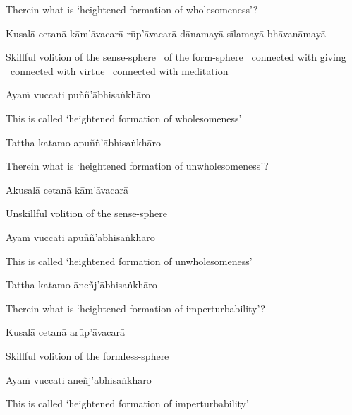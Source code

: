 \begin{english}
  Therein what is `heightened formation of wholesomeness'?
\end{english}

\begin{pali-hang}
  Kusalā cetanā kām'āvacarā rūp'āvacarā dānamayā sīlamayā bhāvanāmayā
\end{pali-hang}

\begin{english-hang}
  Skillful volition of the sense-sphere \breathmark\ of the form-sphere \breathmark\ connected with giving \breathmark\ connected with virtue \breathmark\ connected with meditation
\end{english-hang}

Ayaṁ vuccati puññ'ābhisaṅkhāro

\begin{english}
  This is called `heightened formation of wholesomeness'
\end{english}

Tattha katamo apuññ'ābhisaṅkhāro

\begin{english}
  Therein what is `heightened formation of unwholesomeness'?
\end{english}

Akusalā cetanā kām'āvacarā

\begin{english}
  Unskillful volition of the sense-sphere
\end{english}

Ayaṁ vuccati apuññ'ābhisaṅkhāro

\begin{english}
  This is called `heightened formation of unwholesomeness'
\end{english}

Tattha katamo āneñj'ābhisaṅkhāro

\begin{english}
  Therein what is `heightened formation of imperturbability'?
\end{english}

Kusalā cetanā arūp'āvacarā

\begin{english}
  Skillful volition of the formless-sphere
\end{english}

Ayaṁ vuccati āneñj'ābhisaṅkhāro

\begin{english}
  This is called `heightened formation of imperturbability'
\end{english}

